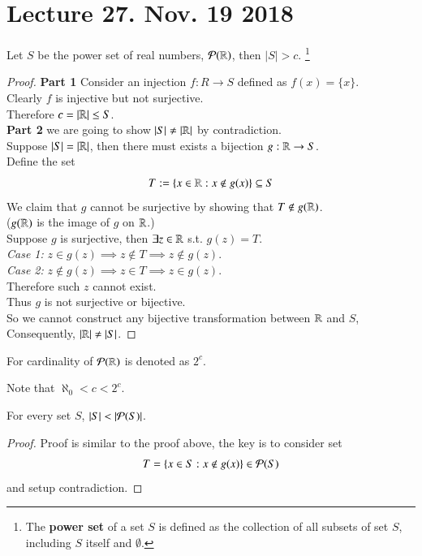 \documentclass[10pt]{article}
\begin{document}
	\section{Lecture 27. Nov. 19 2018}
		\begin{theorem}
			Let $S$ be the power set of real numbers, $\mathcal{{P}}(\mathbb{R})$, then $|S| > c$. \footnote{The \textbf{power set} of a set $S$ is defined as the collection of all subsets of set $S$, including $S$ itself and $\emptyset$.}
			\begin{proof}
				\textbf{Part 1} Consider an injection $f: R \to S$ defined as $f(x) = \{x\}$. \\
				Clearly $f$ is injective but not surjective. \\
				Therefore $c = |\mathbb{R}| \leq S$. \\
				\textbf{Part 2} we are going to show $|S| \neq |\mathbb{R}|$ by contradiction. \\
				Suppose $|S| = |\mathbb{R}|$, then there must exists a bijection $g: \mathbb{R} \to S$. \\
				Define the set 
				\[
					T := \{x \in \mathbb{R}: x \notin g(x)\} \subseteq S
				\]
				We claim that $g$ cannot be surjective by showing that $T \notin g(\mathbb{R})$. \\
				($g(\mathbb{R})$ is the image of $g$ on $\mathbb{R}$.) \\
				Suppose $g$ is surjective, then $\exists z \in \mathbb{R}$ s.t. $g(z) = T$. \\
				\emph{Case 1:} $z \in g(z) \implies z \notin T \implies z \notin g(z)$. \\
				\emph{Case 2:} $z \notin g(z) \implies z \in T \implies z \in g(z)$. \\
				Therefore such $z$ cannot exist. \\
				Thus $g$ is not surjective or bijective. \\
				So we cannot construct any bijective transformation between $\mathbb{R}$ and $S$, \\
				Consequently, $|\mathbb{R}| \neq |S|$.
			\end{proof}
		\end{theorem}
		\begin{notation}
			For cardinality of $\mathcal{{P}}(\mathbb{R})$ is denoted as $2^c$.
		\end{notation}
		
		\begin{remark}
			Note that $\aleph_0 < c < 2^c$.
		\end{remark}
		
		\begin{theorem}[10.3.27]
			For every set $S$, $|S| < |\mathcal{{P}}(S)|$.
			\begin{proof}
				Proof is similar to the proof above, the key is to consider set
				\[
					T = \{x \in S: x \notin g(x)\} \in \mathcal{{P}}(S)
				\]
				and setup contradiction.
			\end{proof}
		\end{theorem}
		
\end{document}
